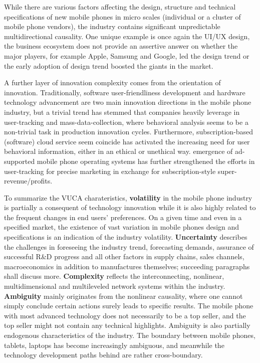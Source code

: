 \documentclass[utf8,english]{gradu3}
\begin{document}
While there are various factors affecting the design, structure and technical specifications of new mobile phones in micro scales (individual or a cluster of mobile phone vendors), the industry contains significant unpredictable multidirectional causality. One unique example is once again the UI/UX design, the business ecosystem does not provide an assertive answer on whether the major players, for example Apple, Samsung and Google, led the design trend or the early adoption of design trend boosted the giants in the market.

A further layer of innovation complexity comes from the orientation of innovation. Traditionally, software user-friendliness development and hardware technology advancement are two main innovation directions in the mobile phone industry, but a trivial trend has stemmed that companies heavily leverage in user-tracking and mass-data-collection, where behavioral analysis seems to be a non-trivial task in production innovation cycles. Furthermore, subscription-based (software) cloud service seem coincide has activated the increasing need for user behavioral information, either in an ethical or unethical way. emergence of ad-supported mobile phone operating systems has further strengthened the efforts in user-tracking for precise marketing in exchange for subscription-style super-revenue/profits. 

To summarize the VUCA charateristics, \textbf{volatility} in the mobile phone industry is partially a consequent of technology innovation while it is also highly related to the frequent changes in end users’ preferences. On a given time and even in a specified market, the existence of vast variation in mobile phones design and specifications is an indication of the industry volatility. \textbf{Uncertainty} describes the challenges in foreseeing the industry trend, forecasting demands, assurance of successful R\&D progress and all other factors in supply chains, sales channels, macroeconomics in addition to manufactures themselves; succeeding paragraphs shall discuss more. \textbf{Complexity} reflects the interconnecting, nonlinear, multidimensional and multileveled network systems within the industry. \textbf{Ambiguity} mainly originates from the nonlinear causality, where one cannot simply conclude certain actions surely leads to specific results. The mobile phone with most advanced technology does not necessarily to be a top seller, and the top seller might not contain any technical highlights. Ambiguity is also partially endogenous characteristics of the industry. The boundary between mobile phones, tablets, laptops has become increasingly ambiguous, and meanwhile the technology development paths behind are rather cross-boundary.
\end{document}
